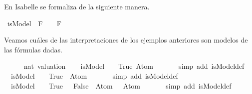 \begin{isabellebody}
\begin{isamarkuptext}
  En Isabelle se formaliza de la siguiente manera.%
\end{isamarkuptext}\isamarkuptrue%
\isamarkupfalse%
\ {\isachardoublequoteopen}isModel\ {\isasymA}\ F\ {\isasymequiv}\ {\isasymA}\ {\isasymTurnstile}\ F{\isachardoublequoteclose}%
\begin{isamarkuptext}%
Veamos cuáles de las interpretaciones de los ejemplos anteriores
  son modelos de las fórmulas dadas.%
\end{isamarkuptext}\isamarkuptrue%
\isamarkupfalse%
\isanewline
{}\isanewline
%
\isadelimproof
\ \ %
\endisadelimproof
%
\isatagproof
{}\isamarkupfalse%
\ {\isasymA}\ {\isacharcolon}{\isacharcolon}\ {\isachardoublequoteopen}nat\ valuation{\isachardoublequoteclose}\isanewline
\isanewline
\ \ \isamarkupfalse%
\ {\isachardoublequoteopen}isModel\ {\isacharparenleft}{\isasymA}\ {\isacharparenleft}{}\ {\isacharcolon}{\isacharequal}\ True{\isacharparenright}{\isacharparenright}\ {\isacharparenleft}Atom\ {}{\isacharparenright}{\isachardoublequoteclose}\isanewline
\ \ \ \ \isamarkupfalse%
\ {\isacharparenleft}simp\ add{\isacharcolon}\ isModel{\isacharunderscore}def{\isacharparenright}\isanewline
\isanewline
\ \ \isamarkupfalse%
\ {\isachardoublequoteopen}{\isasymnot}\ isModel\ {\isacharparenleft}{\isasymA}\ {\isacharparenleft}{}\ {\isacharcolon}{\isacharequal}\ True{\isacharparenright}{\isacharparenright}\ {\isacharparenleft}\isactrlbold {\isasymnot}\ {\isacharparenleft}Atom\ {}{\isacharparenright}{\isacharparenright}{\isachardoublequoteclose}\isanewline
\ \ \ \ \isamarkupfalse%
\ {\isacharparenleft}simp\ add{\isacharcolon}\ isModel{\isacharunderscore}def{\isacharparenright}\isanewline
\isanewline
\ \ \isamarkupfalse%
\ {\isachardoublequoteopen}{\isasymnot}\ isModel\ {\isacharparenleft}{\isasymA}\ {\isacharparenleft}{}\ {\isacharcolon}{\isacharequal}\ True{\isacharcomma}\ {}\ {\isacharcolon}{\isacharequal}\ False{\isacharparenright}{\isacharparenright}\ {\isacharparenleft}\isactrlbold {\isasymnot}\ {\isacharparenleft}Atom\ {}{\isacharparenright}\ \isactrlbold {\isasymand}\ {\isacharparenleft}Atom\ {}{\isacharparenright}{\isacharparenright}{\isachardoublequoteclose}\isanewline
\ \ \ \ \isamarkupfalse%
\ {\isacharparenleft}simp\ add{\isacharcolon}\ isModel{\isacharunderscore}def{\isacharparenright}\isanewline
\isanewline
\ \ \isamarkupfalse%

\end{isabellebody}
